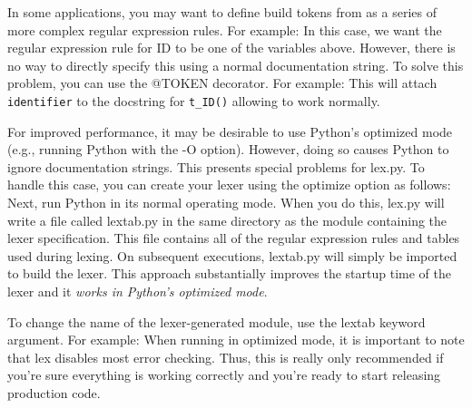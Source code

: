 
In some applications, you may want to define build tokens from as a series of
more complex regular expression rules. For example:
In this case, we want the regular expression rule for ID to be one of the
variables above. However, there is no way to directly specify this using a
normal documentation string. To solve this problem, you can use the @TOKEN
decorator. For example:
This will attach \verb|identifier| to the docstring for \verb|t_ID()| allowing
 to work normally.


For improved performance, it may be desirable to use Python's optimized mode
(e.g., running Python with the -O option). However, doing so causes Python to
ignore documentation strings. This presents special problems for lex.py. To
handle this case, you can create your lexer using the optimize option as
follows:
Next, run Python in its normal operating mode. When you do this, lex.py will
write a file called lextab.py in the same directory as the module containing the
lexer specification. This file contains all of the regular expression rules and
tables used during lexing. On subsequent executions, lextab.py will simply be
imported to build the lexer. This approach substantially improves the startup
time of the lexer and it \emph{works in Python's optimized mode}.

To change the name of the lexer-generated module, use the lextab keyword
argument. For example:
When running in optimized mode, it is important to note that lex disables most
error checking. Thus, this is really only recommended if you're sure everything
is working correctly and you're ready to start releasing production code.

\secup

